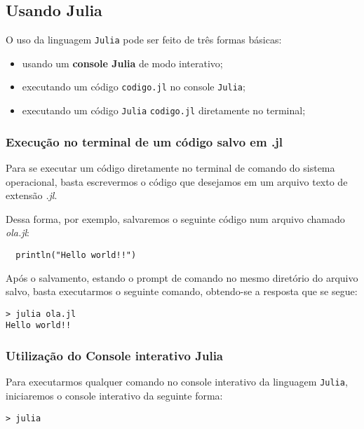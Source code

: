 \subsection{Usando Julia}

O uso da linguagem \verb+Julia+ pode ser feito de três formas básicas:

\begin{itemize}
\item usando um {\bf console Julia} de modo interativo;
\item executando um código \verb+codigo.jl+ no console \verb+Julia+;
\item executando um código \verb+Julia+ \verb+codigo.jl+ diretamente no terminal;
\end{itemize}

\subsubsection{Execução no terminal de um código salvo em .jl}

Para se executar um código diretamente no terminal de comando do sistema operacional, basta escrevermos o código que desejamos em um arquivo texto de extensão \emph{.jl}.

Dessa forma, por exemplo, salvaremos o seguinte código num arquivo chamado \emph{ola.jl}:

\begin{lstlisting}
  println("Hello world!!")
\end{lstlisting}

Após o salvamento, estando o prompt de comando no mesmo diretório do arquivo salvo, basta executarmos o seguinte comando, obtendo-se a resposta que se segue:

\begin{lstlisting}[style=c]
> julia ola.jl
Hello world!!
\end{lstlisting}

\subsubsection{Utilização do Console interativo Julia}

Para executarmos qualquer comando no console interativo da linguagem \verb+Julia+, iniciaremos o console interativo da seguinte forma:

\begin{lstlisting}[style=c]
> julia
\end{lstlisting}

